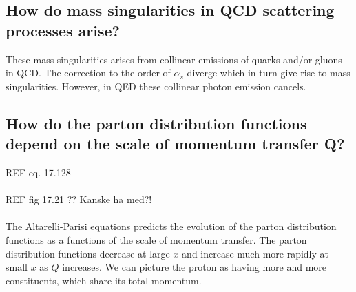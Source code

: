 \documentclass[paper=a4, fontsize=11pt]{scrartcl} %
\numberwithin{equation}{section} %
\numberwithin{figure}{section} %
\numberwithin{table}{section} %
\begin{document}
\subsection{How do mass singularities in QCD scattering processes arise?}

These mass singularities arises from collinear emissions of quarks and/or gluons in QCD. The correction to the order of $\alpha_s$ diverge which in turn give rise to mass singularities. However, in QED these collinear photon emission cancels.

\subsection{How do the parton distribution functions depend on the scale of momentum transfer Q?}

REF eq. 17.128 \\
\\
REF fig 17.21 ?? Kanske ha med?! \\
\\

The Altarelli-Parisi equations predicts the evolution of the parton distribution functions as a functions of the scale of momentum transfer. The parton distribution functions decrease at large $x$ and increase much more rapidly at small $x$ as $Q$ increases. We can picture the proton as having more and more constituents, which share its total momentum.
\end{document}
